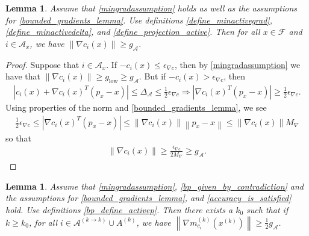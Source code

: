 \documentclass{article}
\newtheorem{lemma}[theorem]{Lemma}
\theoremstyle{case}
\numberwithin{theorem}{subsection}
\newcommand{\feasible}{{\mathcal F}}
\newcommand{\gmcik}{{\nabla m_{c_i}^{(k)}\left(\xk\right)}}
\newcommand{\maxgrad}{{M_{\nabla}}}
\newcommand{\minactivegraddelta}{{\Delta_{\mathcal A}}}
\newcommand{\minactivegrad}{{ g_{\mathcal A} }}
\newcommand{\mingradepsilon}{{\epsilon_{\nabla c}}}
\newcommand{\mingrad}{{ g_{\textrm{low}} }}
\newcommand{\xk}{x^{(k)}}
\begin{document}
\begin{lemma}
\label{min_active_gradient_lemma}
Assume that \cref{mingradassumption} holds as well as the assumptions for \cref{bounded_gradients_lemma}.
Use definitions \cref{define_minactivegrad}, \cref{define_minactivedelta}, and \cref{define_projection_active}.
Then for all $x \in \feasible$ and $i \in \mathcal A_x$, we have $\left\|\nabla c_i(x)\right\| \ge \minactivegrad$.
\end{lemma}

\begin{proof}
Suppose that $i \in \mathcal A_x$.
If $-c_i(x) \le \mingradepsilon$, then by \cref{mingradassumption} we have that $\|\nabla c_i(x)\| \ge \mingrad \ge \minactivegrad$.
But if $-c_i(x) > \mingradepsilon$, then
\begin{align*}
\left|c_i(x) + \nabla c_i(x)^T(p_x - x)\right| \le \minactivegraddelta \le \frac 1 2 \mingradepsilon
\Longrightarrow \left|\nabla c_i(x)^T(p_x - x)\right| \ge \frac 1 2 \mingradepsilon.
\end{align*}
Using properties of the norm and \cref{bounded_gradients_lemma}, we see
\begin{align*}
\frac 1 2 \mingradepsilon \le \left|\nabla c_i(x)^T(p_x - x)\right| \le \left\|\nabla c_i(x)\right\|\left\|p_x - x\right\| \le \left\|\nabla c_i(x)\right\| \maxgrad
\end{align*}
so that 
\begin{align*}
\left\|\nabla c_i(x)\right\| \ge \frac {\mingradepsilon} {2 \maxgrad} \ge \minactivegrad.
\end{align*}
\end{proof}




\begin{lemma}
\label{min_active_model_gradient_lemma}
Assume that
\cref{mingradassumption}, \cref{bp_given_by_contradiction}
and the assumptions for
\cref{bounded_gradients_lemma}, and \cref{accuracy_is_satisfied} hold.
Use definitions \cref{bp_define_activep}.
Then there exists a $k_0$ such that if $k \ge k_0$,
for all $i \in \mathcal A^{(k\to k)} \cup A^{(k)}$, we have $\left\|\gmcik\right\| \ge \frac 1 2 \minactivegrad$.
\end{lemma}
\end{document}
